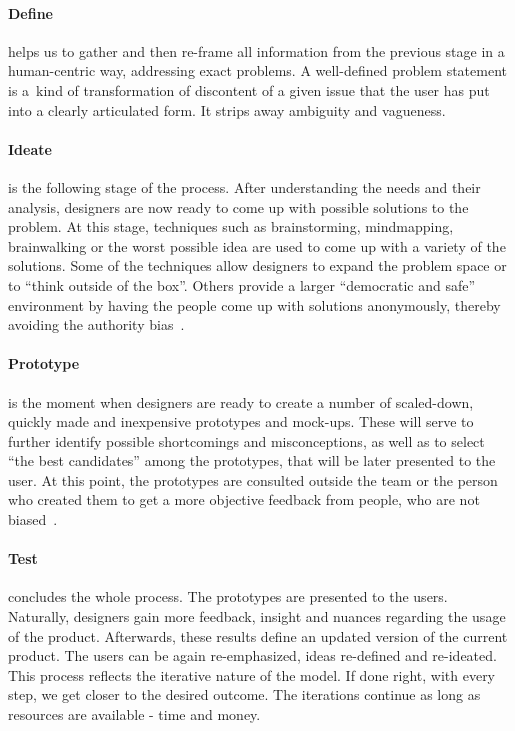 \paragraph{Define}
helps us to gather and then re-frame all information from the previous stage in a human-centric way, addressing exact problems. A well-defined problem statement is a~kind of transformation of discontent of a given issue that the user has put into a clearly articulated form. It strips away ambiguity and vagueness.

\paragraph{Ideate}
is the following stage of the process. After understanding the needs and their analysis, designers are now ready to come up with possible solutions to the problem. At this stage, techniques such as brainstorming, mindmapping, brainwalking or the worst possible idea are used to come up with a variety of the solutions. Some of the techniques allow designers to expand the problem space or to “think outside of the box”. Others provide a larger “democratic and safe” environment by having the people come up with solutions anonymously, thereby avoiding the authority bias~\cite{AuthorityBias}.

\paragraph{Prototype}
is the moment when designers are ready to create a number of scaled-down, quickly made and inexpensive prototypes and mock-ups. These will serve to further identify possible shortcomings and misconceptions, as well as to select “the best candidates” among the prototypes, that will be later presented to the user. At this point, the prototypes are consulted outside the team or the person who created them to get a more objective feedback from people, who are not biased~\cite{Kahneman}.

\paragraph{Test}
concludes the whole process. The prototypes are presented to the users. Naturally, designers gain more feedback, insight and nuances regarding the usage of the product. Afterwards, these results define an updated version of the current product. The users can be again re-emphasized, ideas re-defined and re-ideated. This process reflects the iterative nature of the model. If done right, with every step, we get closer to the desired outcome. The iterations continue as long as resources are available - time and money.

